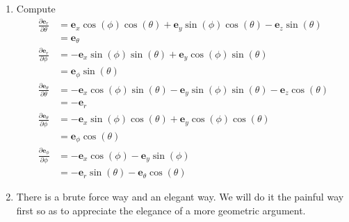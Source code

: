 \documentclass[a4paper]{article}
\begin{document}
\begin{enumerate}[label=(\alph*)]
	\item Compute
	\begin{align*}
		\frac{\partial \pmb{e}_{r}}{\partial \theta} & = \pmb{e}_{x}\cos\!\left(\phi\right)\cos\!\left(\theta\right) + \pmb{e}_{y}\sin\!\left(\phi\right)\cos\!\left(\theta\right) - \pmb{e}_{z}\sin\!\left(\theta\right) \\
		 & = \pmb{e}_{\theta} \\ 
		\frac{\partial \pmb{e}_{r}}{\partial \phi} & = -\pmb{e}_{x}\sin\!\left(\phi\right)\sin\!\left(\theta\right) + \pmb{e}_{y}\cos\!\left(\phi\right)\sin\!\left(\theta\right) \\
							   & = \pmb{e}_{\phi}\sin\!\left(\theta\right) \\
							\frac{\partial \pmb{e}_{\theta}}{\partial \theta} & = -\pmb{e}_{x}\cos\!\left(\phi\right)\sin\!\left(\theta\right) - \pmb{e}_{y}\sin\!\left(\phi\right)\sin\!\left(\theta\right) - \pmb{e}_{z}\cos\!\left(\theta\right) \\
													  & = -\pmb{e}_{r} \\
													\frac{\partial \pmb{e}_{\theta}}{\partial \phi} & = -\pmb{e}_{x}\sin\!\left(\phi\right)\cos\!\left(\theta\right) + \pmb{e}_{y}\cos\!\left(\phi\right)\cos\!\left(\theta\right) \\
																			& = \pmb{e}_{\phi}\cos\!\left(\theta\right) \\
																		\frac{\partial \pmb{e}_{\phi}}{\partial \phi} & = -\pmb{e}_{x}\cos\!\left(\phi\right) - \pmb{e}_{y}\sin\!\left(\phi\right) \\
																							      & = -\pmb{e}_{r}\sin\!\left(\theta\right) - \pmb{e}_{\theta}\cos\!\left(\theta\right)
	\end{align*}
	\item There is a brute force way and an elegant way. We will do it the painful way first so as to appreciate the elegance of a more geometric argument.


\end{enumerate}
\end{document}
